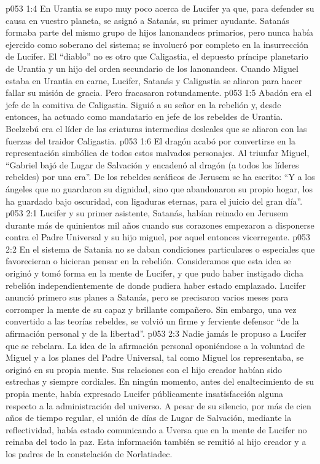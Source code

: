 \vs p053 1:4 En Urantia se supo muy poco acerca de Lucifer ya que, para defender su causa en vuestro planeta, se asignó a Satanás, su primer ayudante. Satanás formaba parte del mismo grupo de hijos lanonandecs primarios, pero nunca había ejercido como soberano del sistema; se involucró por completo en la insurrección de Lucifer. El “diablo” no es otro que Caligastia, el depuesto príncipe planetario de Urantia y un hijo del orden secundario de los lanonandecs. Cuando Miguel estaba en Urantia en carne, Lucifer, Satanás y Caligastia se aliaron para hacer fallar su misión de gracia. Pero fracasaron rotundamente.
\vs p053 1:5 Abadón era el jefe de la comitiva de Caligastia. Siguió a su señor en la rebelión y, desde entonces, ha actuado como mandatario en jefe de los rebeldes de Urantia. Beelzebú era el líder de las criaturas intermedias desleales que se aliaron con las fuerzas del traidor Caligastia.
\vs p053 1:6 \pc El dragón acabó por convertirse en la representación simbólica de todos estos malvados personajes. Al triunfar Miguel, “Gabriel bajó de Lugar de Salvación y encadenó al dragón (a todos los líderes rebeldes) por una era”. De los rebeldes seráficos de Jerusem se ha escrito: “Y a los ángeles que no guardaron su dignidad, sino que abandonaron su propio hogar, los ha guardado bajo oscuridad, con ligaduras eternas, para el juicio del gran día”.
\vs p053 2:1 Lucifer y su primer asistente, Satanás, habían reinado en Jerusem durante más de quinientos mil años cuando sus corazones empezaron a disponerse contra el Padre Universal y su hijo miguel, por aquel entonces vicerregente.
\vs p053 2:2 En el sistema de Satania no se daban condiciones particulares o especiales que favorecieran o hicieran pensar en la rebelión. Consideramos que esta idea se originó y tomó forma en la mente de Lucifer, y que pudo haber instigado dicha rebelión independientemente de donde pudiera haber estado emplazado. Lucifer anunció primero sus planes a Satanás, pero se precisaron varios meses para corromper la mente de su capaz y brillante compañero. Sin embargo, una vez convertido a las teorías rebeldes, se volvió un firme y ferviente defensor “de la afirmación personal y de la libertad”.
\vs p053 2:3 \pc Nadie jamás le propuso a Lucifer que se rebelara. La idea de la afirmación personal oponiéndose a la voluntad de Miguel y a los planes del Padre Universal, tal como Miguel los representaba, se originó en su propia mente. Sus relaciones con el hijo creador habían sido estrechas y siempre cordiales. En ningún momento, antes del enaltecimiento de su propia mente, había expresado Lucifer públicamente insatisfacción alguna respecto a la administración del universo. A pesar de su silencio, por más de cien años de tiempo regular, el unión de días de Lugar de Salvación, mediante la reflectividad, había estado comunicando a Uversa que en la mente de Lucifer no reinaba del todo la paz. Esta información también se remitió al hijo creador y a los padres de la constelación de Norlatiadec.
